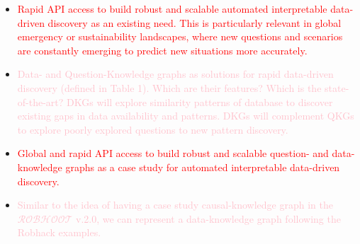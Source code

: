 \documentclass[12pt, a4paper]{article} %
\begin{document}
\begin{itemize}
      \item \textcolor{red}{Rapid API access to build
          robust and scalable automated interpretable data-driven
          discovery as an existing need. This is particularly relevant
          in global emergency or sustainability landscapes, where new
          questions and scenarios are constantly emerging to predict
          new situations more accurately.}
      \item \textcolor{pink}{Data- and Question-Knowledge graphs as
          solutions for rapid data-driven discovery (defined in Table
          1). Which are their features? Which is the state-of-the-art?
          DKGs will explore similarity patterns of database to
          discover existing gaps in data availability and
          patterns. DKGs will complement QKGs to explore poorly
          explored questions to new pattern discovery.  }
      \item \textcolor{red}{Global and rapid API access to build
          robust and scalable question- and data-knowledge graphs as a
          case study for automated interpretable data-driven
          discovery.}
      \item \textcolor{pink}{Similar to the idea of having a case
          study causal-knowledge graph in the $\mathcal{ROBHOOT}$
          v.2.0, we can represent a data-knowledge graph following the
          Robhack examples.}
      \end{itemize}
      
\end{document}
